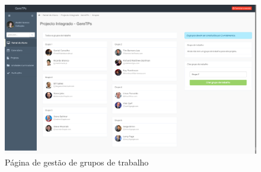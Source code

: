 \begin{figure}[H]
  \centering
  \includegraphics[width=1\textwidth,center]{images/implementacao/alunos/groups_create}
  \caption{Página de gestão de grupos de trabalho}
  \label{fig:student_groups_create}
\end{figure}
